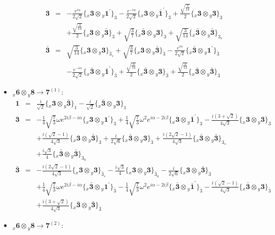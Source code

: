 \documentclass[english]{article}
\newcommand{\rep}[1]{\mathbf{#1}}
\newcommand{\repx}[2]{{}_{#2}\mathbf{#1}}
\newcommand{\subcg}[3]{\big\{ \repx{#1}{x}\otimes\repx{#2}{y}\big\}^{}_{#3}}
\begin{document}
\begin{itemize}
\begin{eqnarray*}
\rep{3} &=& -\frac{e^{i \alpha }}{2 \sqrt{2}}\subcg{3}{1^{\prime}}{3}-\frac{e^{-i \alpha }}{2 \sqrt{2}}\subcg{3}{\bar{1}^{\prime}}{3}+\frac{\sqrt{\frac{3}{14}}}{2}\subcg{3}{3}{3} \\ 
 & & +\frac{\sqrt{\frac{3}{14}}}{2}\subcg{3}{\bar{3}}{3}+\sqrt{\frac{3}{7}}\subcg{\bar{3}}{3}{3}+\sqrt{\frac{3}{14}}\subcg{\bar{3}}{\bar{3}}{3_{s}}
\\
\rep{\bar{3}} &=& \sqrt{\frac{3}{14}}\subcg{3}{3}{\bar{3}_{s}}+\sqrt{\frac{3}{7}}\subcg{3}{\bar{3}}{\bar{3}}-\frac{e^{i \alpha }}{2 \sqrt{2}}\subcg{\bar{3}}{1^{\prime}}{\bar{3}} \\ 
 & & -\frac{e^{-i \alpha }}{2 \sqrt{2}}\subcg{\bar{3}}{\bar{1}^{\prime}}{\bar{3}}+\frac{\sqrt{\frac{3}{14}}}{2}\subcg{\bar{3}}{3}{\bar{3}}+\frac{\sqrt{\frac{3}{14}}}{2}\subcg{\bar{3}}{\bar{3}}{\bar{3}}
\end{eqnarray*}
\item $\repx{6}{x}\otimes\repx{8}{y}\to\rep{7}^{(1)}$:
\begin{eqnarray*}
\rep{1} &=& \frac{i}{\sqrt{2}}\subcg{3}{\bar{3}}{1}-\frac{i}{\sqrt{2}}\subcg{\bar{3}}{3}{1}
\\
\rep{3} &=& -\frac{1}{4} \sqrt{\frac{7}{3}} \omega  e^{2 i \beta -i \alpha }\subcg{3}{1^{\prime}}{3}+\frac{1}{4} \sqrt{\frac{7}{3}} \omega ^2 e^{i \alpha -2 i \beta }\subcg{3}{\bar{1}^{\prime}}{3}-\frac{i \left(3+\sqrt{2}\right)}{4 \sqrt{3}}\subcg{3}{3}{3} \\ 
 & & +\frac{i \left(\sqrt{2}-1\right)}{4 \sqrt{3}}\subcg{3}{\bar{3}}{3}+\frac{i}{2 \sqrt{6}}\subcg{\bar{3}}{3}{3}+\frac{i \left(2 \sqrt{2}-1\right)}{4 \sqrt{3}}\subcg{\bar{3}}{\bar{3}}{3_{s}} \\ 
 & & +\frac{i \sqrt{3}}{4}\subcg{\bar{3}}{\bar{3}}{3_{a}}
\\
\rep{\bar{3}} &=& -\frac{i \left(2 \sqrt{2}-1\right)}{4 \sqrt{3}}\subcg{3}{3}{\bar{3}_{s}}-\frac{i \sqrt{3}}{4}\subcg{3}{3}{\bar{3}_{a}}-\frac{i}{2 \sqrt{6}}\subcg{3}{\bar{3}}{\bar{3}} \\ 
 & & +\frac{1}{4} \sqrt{\frac{7}{3}} \omega  e^{2 i \beta -i \alpha }\subcg{\bar{3}}{1^{\prime}}{\bar{3}}-\frac{1}{4} \sqrt{\frac{7}{3}} \omega ^2 e^{i \alpha -2 i \beta }\subcg{\bar{3}}{\bar{1}^{\prime}}{\bar{3}}-\frac{i \left(\sqrt{2}-1\right)}{4 \sqrt{3}}\subcg{\bar{3}}{3}{\bar{3}} \\ 
 & & +\frac{i \left(3+\sqrt{2}\right)}{4 \sqrt{3}}\subcg{\bar{3}}{\bar{3}}{\bar{3}}
\end{eqnarray*}
\item $\repx{6}{x}\otimes\repx{8}{y}\to\rep{7}^{(2)}$:

\end{itemize}
\end{document}
